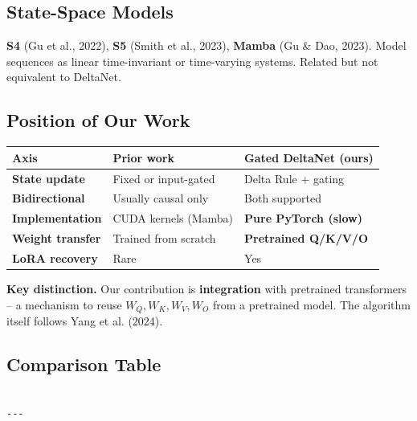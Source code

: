 \subsection{State-Space Models}

\textbf{S4} (Gu et al., 2022), \textbf{S5} (Smith et al., 2023), \textbf{Mamba} (Gu \& Dao, 
2023). Model sequences as linear time-invariant or time-varying systems. 
Related but not equivalent to DeltaNet.

\subsection{Position of Our Work}

\begin{table}[H]
\centering
\small
\begin{tabular}{lll}
\toprule
\textbf{Axis} & \textbf{Prior work} & \textbf{Gated DeltaNet (ours)} \\
\midrule
\textbf{State update} & Fixed or input-gated & Delta Rule + gating \\
\textbf{Bidirectional} & Usually causal only & Both supported \\
\textbf{Implementation} & CUDA kernels (Mamba) & \textbf{Pure PyTorch (slow)} \\
\textbf{Weight transfer} & Trained from scratch & \textbf{Pretrained Q/K/V/O} \\
\textbf{LoRA recovery} & Rare & Yes \\
\bottomrule
\end{tabular}
\end{table}

\textbf{Key distinction.} Our contribution is \textbf{integration} with pretrained 
transformers -- a mechanism to reuse $W_Q, W_K, W_V, W_O$ from a pretrained 
model. The algorithm itself follows Yang et al. (2024).



\subsection{Comparison Table}

\begin{lstlisting}

---
\end{lstlisting}